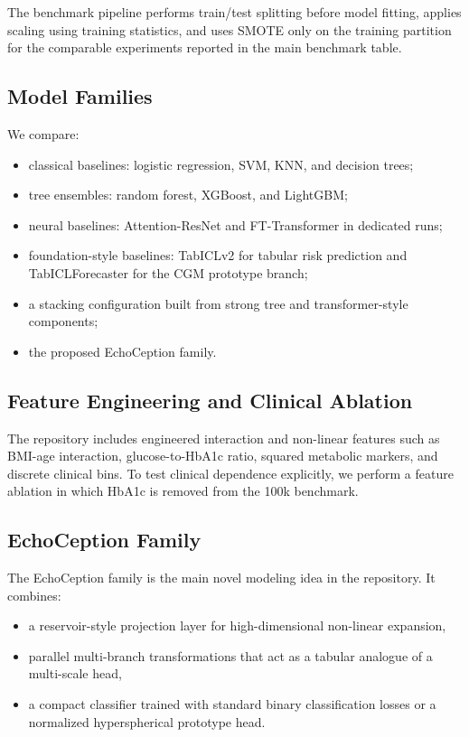 \documentclass[conference]{IEEEtran}
\begin{document}
The benchmark pipeline performs train/test splitting before model fitting, applies scaling using training statistics, and uses SMOTE only on the training partition for the comparable experiments reported in the main benchmark table.

\subsection{Model Families}
We compare:
\begin{itemize}
    \item classical baselines: logistic regression, SVM, KNN, and decision trees;
    \item tree ensembles: random forest, XGBoost, and LightGBM;
    \item neural baselines: Attention-ResNet and FT-Transformer in dedicated runs;
    \item foundation-style baselines: TabICLv2 for tabular risk prediction and TabICLForecaster for the CGM prototype branch;
    \item a stacking configuration built from strong tree and transformer-style components;
    \item the proposed EchoCeption family.
\end{itemize}

\subsection{Feature Engineering and Clinical Ablation}
The repository includes engineered interaction and non-linear features such as BMI-age interaction, glucose-to-HbA1c ratio, squared metabolic markers, and discrete clinical bins. To test clinical dependence explicitly, we perform a feature ablation in which HbA1c is removed from the 100k benchmark.

\subsection{EchoCeption Family}
The EchoCeption family is the main novel modeling idea in the repository. It combines:
\begin{itemize}
    \item a reservoir-style projection layer for high-dimensional non-linear expansion,
    \item parallel multi-branch transformations that act as a tabular analogue of a multi-scale head,
    \item a compact classifier trained with standard binary classification losses or a normalized hyperspherical prototype head.
\end{itemize}
\end{document}
